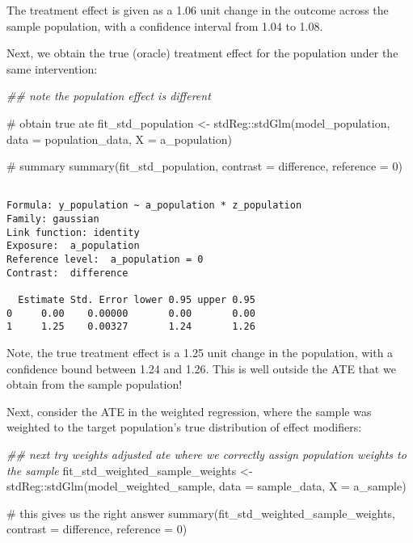\documentclass[
  single column]{article}
\newenvironment{Shaded}{\begin{snugshade}}{\end{snugshade}}
\newcommand{\AttributeTok}[1]{\textcolor[rgb]{0.40,0.45,0.13}{#1}}
\newcommand{\CommentTok}[1]{\textcolor[rgb]{0.37,0.37,0.37}{#1}}
\newcommand{\DecValTok}[1]{\textcolor[rgb]{0.68,0.00,0.00}{#1}}
\newcommand{\DocumentationTok}[1]{\textcolor[rgb]{0.37,0.37,0.37}{\textit{#1}}}
\newcommand{\FunctionTok}[1]{\textcolor[rgb]{0.28,0.35,0.67}{#1}}
\newcommand{\NormalTok}[1]{\textcolor[rgb]{0.00,0.23,0.31}{#1}}
\newcommand{\OtherTok}[1]{\textcolor[rgb]{0.00,0.23,0.31}{#1}}
\newcommand{\SpecialCharTok}[1]{\textcolor[rgb]{0.37,0.37,0.37}{#1}}
\newcommand{\StringTok}[1]{\textcolor[rgb]{0.13,0.47,0.30}{#1}}
\begin{document}
The treatment effect is given as a 1.06 unit change in the outcome
across the sample population, with a confidence interval from 1.04 to
1.08.

Next, we obtain the true (oracle) treatment effect for the population
under the same intervention:

\begin{Shaded}
\begin{Highlighting}[]
\DocumentationTok{\#\# note the population effect is different}

\CommentTok{\# obtain true ate}
\NormalTok{fit\_std\_population }\OtherTok{\textless{}{-}}\NormalTok{ stdReg}\SpecialCharTok{::}\FunctionTok{stdGlm}\NormalTok{(model\_population, }
  \AttributeTok{data =}\NormalTok{ population\_data, }\AttributeTok{X =} \StringTok{\textquotesingle{}a\_population\textquotesingle{}}\NormalTok{)}

\CommentTok{\# summary}
\FunctionTok{summary}\NormalTok{(fit\_std\_population, }\AttributeTok{contrast =} \StringTok{\textquotesingle{}difference\textquotesingle{}}\NormalTok{, }\AttributeTok{reference =} \DecValTok{0}\NormalTok{)}
\end{Highlighting}
\end{Shaded}

\begin{verbatim}

Formula: y_population ~ a_population * z_population
Family: gaussian 
Link function: identity 
Exposure:  a_population 
Reference level:  a_population = 0 
Contrast:  difference 

  Estimate Std. Error lower 0.95 upper 0.95
0     0.00    0.00000       0.00       0.00
1     1.25    0.00327       1.24       1.26
\end{verbatim}

Note, the true treatment effect is a 1.25 unit change in the population,
with a confidence bound between 1.24 and 1.26. This is well outside the
ATE that we obtain from the sample population!

Next, consider the ATE in the weighted regression, where the sample was
weighted to the target population's true distribution of effect
modifiers:

\begin{Shaded}
\begin{Highlighting}[]
\DocumentationTok{\#\# next try weights adjusted ate where we correctly assign population weights to the sample}
\NormalTok{fit\_std\_weighted\_sample\_weights }\OtherTok{\textless{}{-}}\NormalTok{ stdReg}\SpecialCharTok{::}\FunctionTok{stdGlm}\NormalTok{(model\_weighted\_sample, }
  \AttributeTok{data =}\NormalTok{ sample\_data, }\AttributeTok{X =} \StringTok{\textquotesingle{}a\_sample\textquotesingle{}}\NormalTok{)}

\CommentTok{\# this gives us the right answer}
\FunctionTok{summary}\NormalTok{(fit\_std\_weighted\_sample\_weights, }\AttributeTok{contrast =} \StringTok{\textquotesingle{}difference\textquotesingle{}}\NormalTok{, }\AttributeTok{reference =} \DecValTok{0}\NormalTok{)}
\end{Highlighting}
\end{Shaded}
\end{document}
